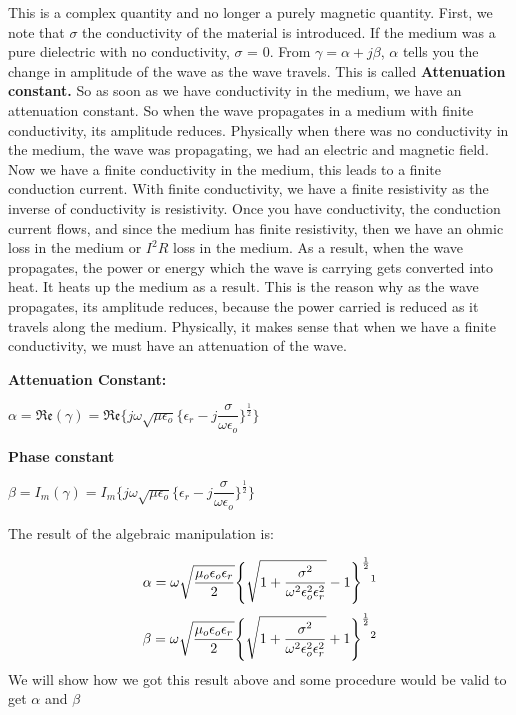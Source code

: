 This is a complex quantity and no longer a purely magnetic quantity. First, we note that $\sigma$ the conductivity of the material is introduced. If the medium was a pure dielectric with no conductivity, $\sigma$ = 0. From $\gamma = \alpha + j\beta$, $\alpha$ tells you the change in amplitude of the wave as the wave travels. This is called \textbf{Attenuation constant.} So as soon as we have conductivity in the medium, we have an attenuation constant. So when the wave propagates in a medium with finite conductivity, its amplitude reduces. Physically when there was no conductivity in the medium, the wave was propagating, we had an electric and magnetic field. Now we have a finite conductivity in the medium, this leads to a finite conduction current. With finite conductivity, we have a finite resistivity as the inverse of conductivity is resistivity. Once you have conductivity, the conduction current flows, and since the medium has finite resistivity, then we have an ohmic loss in the medium or $I^2 R$ loss in the medium. As a result, when the wave propagates, the power or energy which the wave is carrying gets converted into heat. It heats up the medium as a result. This is the reason why as the wave propagates, its amplitude reduces, because the power carried is reduced as it travels along the medium. Physically, it makes sense that when we have a finite conductivity, we must have an attenuation of the wave. 


\textbf{Attenuation Constant:}
\begin{center}
$\alpha = \mathfrak{Re}(\gamma) = \mathfrak{Re}\Bigg\{j\omega\sqrt{\mu\epsilon_{o}}\bigg\{\epsilon_{r} - j\dfrac{\sigma}{\omega\epsilon_{o}}\bigg\}^{\frac{1}{2}}\Bigg\}$
\end{center}
\textbf{Phase constant}
\begin{center}
$\beta = I_{m}(\gamma) = I_{m}\Bigg\{j\omega\sqrt{\mu\epsilon_{o}}\bigg\{\epsilon_{r} - j\dfrac{\sigma}{\omega\epsilon_{o}}\bigg\}^{\frac{1}{2}}\Bigg\}$
\end{center}

The result of the algebraic manipulation is:

\begin{equation}
\alpha = \omega\sqrt{\dfrac{\mu_{o}\epsilon_{o}\epsilon_{r}}{2}}\Bigg\{{\sqrt{1 + \dfrac{\sigma^{2}}{\omega^{2}\epsilon_{o}^{2}\epsilon_{r}^{2}}}} - 1\Bigg\}^{\frac{1}{2}}\footnotemark
\end{equation}
\begin{equation}
\beta = \omega\sqrt{\dfrac{\mu_{o}\epsilon_{o}\epsilon_{r}}{2}}\Bigg\{{\sqrt{1 + \dfrac{\sigma^{2}}{\omega^{2}\epsilon_{o}^{2}\epsilon_{r}^{2}}}} + 1\Bigg\}^{\frac{1}{2}}\footnotemark
\end{equation}
We will show how we got this result above and some procedure would be valid to get $\alpha$ and $\beta$

